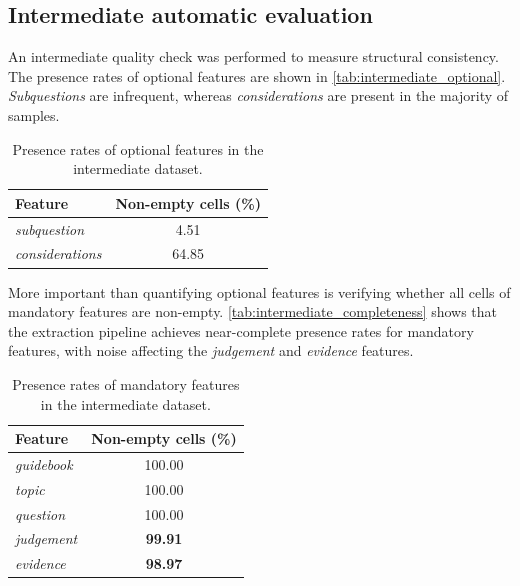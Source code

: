 \documentclass[11pt,a4paper]{article}
\begin{document}




\subsection{Intermediate automatic evaluation}

An intermediate quality check was performed to measure structural consistency. The presence rates of optional features are shown in \autoref{tab:intermediate_optional}. \textit{Subquestions} are infrequent, whereas \textit{considerations} are present in the majority of samples.

\vspace{-0.1cm}

\begin{table}[H]
\centering
\begin{tabular}{lc}
\toprule
\textbf{Feature} & \textbf{Non-empty cells (\%)} \\
\midrule
\textit{subquestion} & 4.51 \\
\textit{considerations} & 64.85 \\
\bottomrule
\end{tabular}
\caption{Presence rates of optional features in the intermediate dataset.}
\label{tab:intermediate_optional}
\end{table}

More important than quantifying optional features is verifying whether all cells of mandatory features are non-empty. \autoref{tab:intermediate_completeness} shows that the extraction pipeline achieves near-complete presence rates for mandatory features, with noise affecting the \textit{judgement} and \textit{evidence} features.

\begin{table}[H]
\centering
\begin{tabular}{lc}
\toprule
\textbf{Feature} & \textbf{Non-empty cells (\%)} \\
\midrule
\textit{guidebook} & 100.00 \\
\textit{topic} & 100.00 \\
\textit{question} & 100.00 \\
\textit{judgement} & \textbf{99.91} \\
\textit{evidence} & \textbf{98.97} \\
\bottomrule
\end{tabular}
\caption{Presence rates of mandatory features in the intermediate dataset.}
\label{tab:intermediate_completeness}
\end{table}
\end{document}
